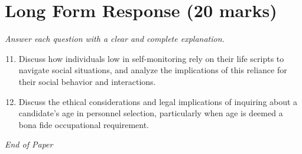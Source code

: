 \documentclass[12pt]{article}
\begin{document}
\section*{Long Form Response (20 marks)}
\textit{Answer each question with a clear and complete explanation.}
\begin{enumerate}[label=\arabic*.]
\setcounter{enumi}{10}
\item Discuss how individuals low in self-monitoring rely on their life scripts to navigate social situations, and analyze the implications of this reliance for their social behavior and interactions.
\item Discuss the ethical considerations and legal implications of inquiring about a candidate's age in personnel selection, particularly when age is deemed a bona fide occupational requirement.
\end{enumerate}

\vfill
\noindent\textit{End of Paper}
\end{document}
